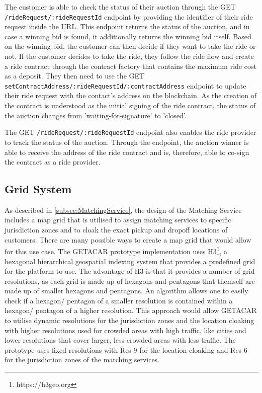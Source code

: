 The customer is able to check the status of their auction through the GET \texttt{/rideRequest/:rideRequestId} endpoint by providing the identifier of their ride request inside the URL. This endpoint returns the status of the auction, and in case a winning bid is found, it additionally returns the winning bid itself. Based on the winning bid, the customer can then decide if they want to take the ride or not. If the customer decides to take the ride, they follow the ride flow and create a ride contract through the contract factory that contains the maximum ride cost as a deposit. They then need to use the GET \texttt{setContractAddress/:rideRequestId/:contractAddress} endpoint to update their ride request with the contact's address on the blockchain. As the creation of the contract is understood as the initial signing of the ride contract, the status of the auction changes from 'waiting-for-signature' to 'closed'. 

The GET \texttt{/rideRequest/:rideRequestId} endpoint also enables the ride provider to track the status of the auction. Through the endpoint, the auction winner is able to receive the address of the ride contract and is, therefore, able to co-sign the contract as a ride provider.

\subsection{Grid System}
As described in \ref{subsec:MatchingService}, the design of the Matching Service includes a map grid that is utilised to assign matching services to specific jurisdiction zones and to cloak the exact pickup and dropoff locations of customers. There are many possible ways to create a map grid that would allow for this use case. The GETACAR prototype implementation uses H3\footnote{https://h3geo.org}, a hexagonal hierarchical geospatial indexing system that provides a predefined grid for the platform to use. The advantage of H3 is that it provides a number of grid resolutions, as each grid is made up of hexagons and pentagons that themself are made up of smaller hexagons and pentagons. An algorithm allows one to easily check if a hexagon/ pentagon of a smaller resolution is contained within a hexagon/ pentagon of a higher resolution. This approach would allow GETACAR to utilise dynamic resolutions for the  jurisdiction zones and the location cloaking with higher resolutions used for crowded areas with high traffic, like cities and lower resolutions that cover larger, less crowded  areas with less traffic. The prototype uses fixed resolutions with Res 9 for the location cloaking and Res 6 for the  jurisdiction zones of the matching services. 

